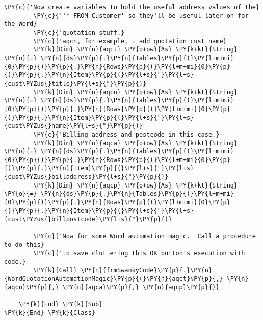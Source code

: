 \begin{Verbatim}[commandchars=\\\{\}]
        \PY{c}{'Now create variables to hold the useful address values of the}
        \PY{c}{''* FROM Customer' so they'll be useful later on for the Word}
        \PY{c}{'quotation stuff.}
        \PY{c}{'aqcn, for example, = add quotation cust name}
        \PY{k}{Dim} \PY{n}{aqct} \PY{o+ow}{As} \PY{k+kt}{String} \PY{o}{=} \PY{n}{ds}\PY{p}{.}\PY{n}{Tables}\PY{p}{(}\PY{l+m+mi}{0}\PY{p}{)}\PY{p}{.}\PY{n}{Rows}\PY{p}{(}\PY{l+m+mi}{0}\PY{p}{)}\PY{p}{.}\PY{n}{Item}\PY{p}{(}\PY{l+s}{"}\PY{l+s}{cust\PYZus{}title}\PY{l+s}{"}\PY{p}{)}
        \PY{k}{Dim} \PY{n}{aqcn} \PY{o+ow}{As} \PY{k+kt}{String} \PY{o}{=} \PY{n}{ds}\PY{p}{.}\PY{n}{Tables}\PY{p}{(}\PY{l+m+mi}{0}\PY{p}{)}\PY{p}{.}\PY{n}{Rows}\PY{p}{(}\PY{l+m+mi}{0}\PY{p}{)}\PY{p}{.}\PY{n}{Item}\PY{p}{(}\PY{l+s}{"}\PY{l+s}{cust\PYZus{}name}\PY{l+s}{"}\PY{p}{)}
        \PY{c}{'Billing address and postcode in this case.}
        \PY{k}{Dim} \PY{n}{aqca} \PY{o+ow}{As} \PY{k+kt}{String} \PY{o}{=} \PY{n}{ds}\PY{p}{.}\PY{n}{Tables}\PY{p}{(}\PY{l+m+mi}{0}\PY{p}{)}\PY{p}{.}\PY{n}{Rows}\PY{p}{(}\PY{l+m+mi}{0}\PY{p}{)}\PY{p}{.}\PY{n}{Item}\PY{p}{(}\PY{l+s}{"}\PY{l+s}{cust\PYZus{}billaddress}\PY{l+s}{"}\PY{p}{)}
        \PY{k}{Dim} \PY{n}{aqcp} \PY{o+ow}{As} \PY{k+kt}{String} \PY{o}{=} \PY{n}{ds}\PY{p}{.}\PY{n}{Tables}\PY{p}{(}\PY{l+m+mi}{0}\PY{p}{)}\PY{p}{.}\PY{n}{Rows}\PY{p}{(}\PY{l+m+mi}{0}\PY{p}{)}\PY{p}{.}\PY{n}{Item}\PY{p}{(}\PY{l+s}{"}\PY{l+s}{cust\PYZus{}billpostcode}\PY{l+s}{"}\PY{p}{)}

        \PY{c}{'Now for some Word automation magic.  Call a procedure to do this}
        \PY{c}{'to save cluttering this OK button's execution with code.}
        \PY{k}{Call} \PY{n}{frmSwankyCode}\PY{p}{.}\PY{n}{WordQuotationAutomationMagic}\PY{p}{(}\PY{n}{aqct}\PY{p}{,} \PY{n}{aqcn}\PY{p}{,} \PY{n}{aqca}\PY{p}{,} \PY{n}{aqcp}\PY{p}{)}

    \PY{k}{End} \PY{k}{Sub}
\PY{k}{End} \PY{k}{Class}
\end{Verbatim}